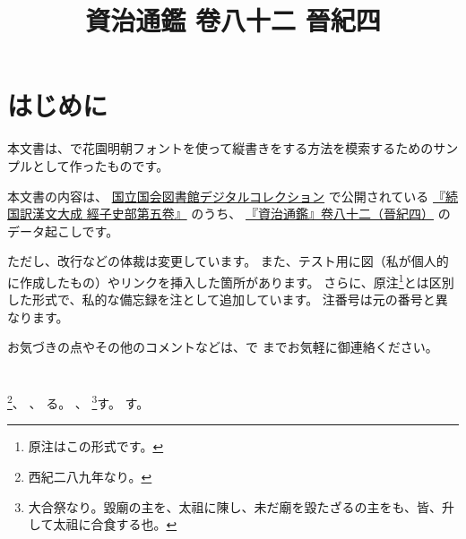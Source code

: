 \documentclass[a4paper,12pt]{article}
\title{資治通鑑 卷八十二 晉紀四\vspace{-3cm}}
\date{}
\begin{document}
\maketitle

\section*{はじめに}

\begin{spacing}{1.4}

本文書は、\yokorm{\XeLaTeX}で花園明朝フォントを使って縦書きをする方法を模索するためのサンプルとして作ったものです。

本文書の内容は、%
\href{http://dl.ndl.go.jp/}{国立国会図書館デジタルコレクション}%
で公開されている%
\href{http://dl.ndl.go.jp/info:ndljp/pid/1239900}{『続国訳漢文大成 經子史部第五卷』}%
%
のうち、%
\href{http://dl.ndl.go.jp/info:ndljp/pid/1239900/156}{%
『資治通鑑』卷八十二（晉紀四）}%
のデータ起こしです。

ただし、改行などの体裁は変更しています。
また、テスト用に図（私が個人的に作成したもの）やリンクを挿入した箇所があります。
さらに、原注\footnote{原注はこの形式です。}とは区別した形式で、私的な備忘録を注として追加しています。
注番号は元の番号と異なります。

お気づきの点やその他のコメントなどは、で%
\href{https://twitter.com/pi\_\_yo\_\_ko}{}%
までお気軽に御連絡ください。
\end{spacing}

\section*{  }




%
\footnote{西紀二八九年なり。}、%
%
、%
%
る。%
、%
\footnote{大合祭なり。毀廟の主を、太祖に陳し、未だ廟を毀たざるの主をも、皆、升して太祖に合食する也。}す。%
す。%
\end{document}
